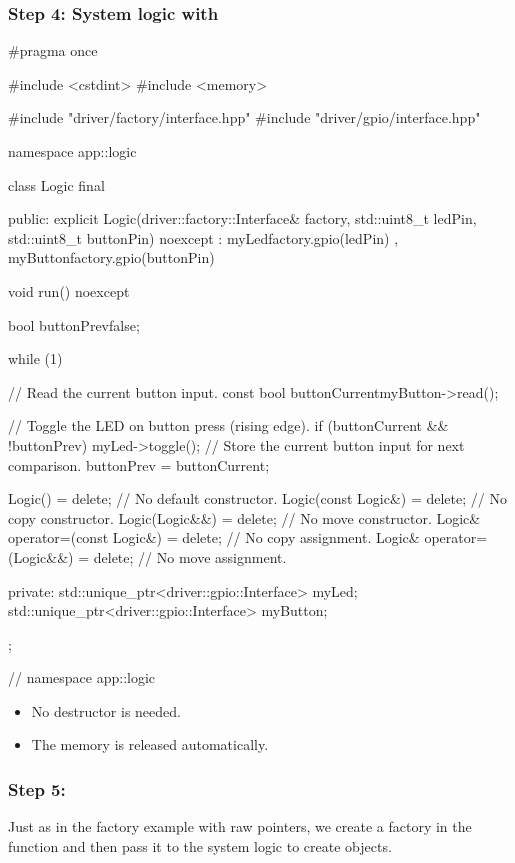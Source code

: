\subsubsection{Step 4: System logic with }

\begin{cppcode}
#pragma once

#include <cstdint>
#include <memory>

#include "driver/factory/interface.hpp"
#include "driver/gpio/interface.hpp"

namespace app::logic
{
class Logic final
{
public:
    explicit Logic(driver::factory::Interface& factory,
                   std::uint8_t ledPin,
                   std::uint8_t buttonPin) noexcept
        : myLed{factory.gpio(ledPin)}
        , myButton{factory.gpio(buttonPin)}
    {}

    void run() noexcept
    {
        bool buttonPrev{false};

        while (1)
        {
            // Read the current button input.
            const bool buttonCurrent{myButton->read()};

            // Toggle the LED on button press (rising edge).
            if (buttonCurrent && !buttonPrev)
            {
                myLed->toggle();
            }
            // Store the current button input for next comparison.
            buttonPrev = buttonCurrent;
        }
    }

    Logic()                        = delete; // No default constructor.
    Logic(const Logic&)            = delete; // No copy constructor.
    Logic(Logic&&)                 = delete; // No move constructor.
    Logic& operator=(const Logic&) = delete; // No copy assignment.
    Logic& operator=(Logic&&)      = delete; // No move assignment.

private:
    std::unique_ptr<driver::gpio::Interface> myLed;
    std::unique_ptr<driver::gpio::Interface> myButton;
};
} // namespace app::logic
\end{cppcode}

\note
\begin{itemize}
  \item No destructor is needed.
  \item The memory is released automatically.
\end{itemize}

\subsubsection{Step 5: }
Just as in the factory example with raw pointers, we create a factory in the  function
and then pass it to the system logic to create objects.

